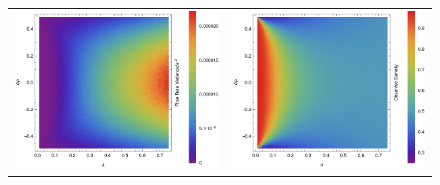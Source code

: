 \begin{figure}[h!]
\begin{center}
\begin{tabular}{c|c}
    \includegraphics[width=0.5\linewidth]{../tex-src/images/constDens/newVar} & \includegraphics[width=0.5\linewidth]{../tex-src/images/constDens/newDens} \\
    \end{tabular}
\end{center}
    \vspace{-0em}
\end{figure}
\fi
